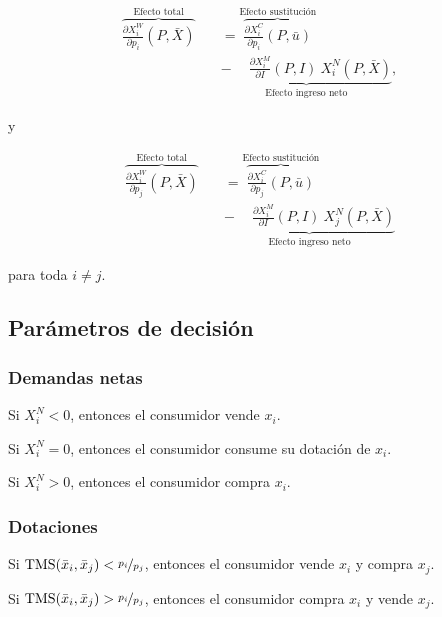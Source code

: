 \documentclass[8pt,a4paper]{extarticle}
\begin{document}
\begin{multicols}{3}
\begin{boxtheo}
	\begin{equation*}
	\begin{aligned}
		\overbrace{\frac{\partial X^W_i}{\partial p_i} (P, \bar{X})}^{\text{Efecto total}} \quad &= \overbrace{\frac{\partial X^C_i}{\partial p_i} (P, \bar{u})}^{\text{Efecto sustitución}} \\
																						   & \underbrace{ - \quad\ \frac{\partial X_i^M}{\partial I} (P, I)\ X^N_i (P,\bar{X})}_{\text{Efecto ingreso neto}},
	\end{aligned}
	\end{equation*}
	
	y
	
	\begin{equation*}
	\begin{aligned}
		\overbrace{\frac{\partial X^W_i}{\partial p_j} (P, \bar{X})}^{\text{Efecto total}} \quad &= \overbrace{\frac{\partial X^C_i}{\partial p_j} (P, \bar{u})}^{\text{Efecto sustitución}} \\
																						   & \underbrace{ - \quad\ \frac{\partial X_i^M}{\partial I} (P, I)\ X^N_j (P,\bar{X})}_{\text{Efecto ingreso neto}}
	\end{aligned}
	\end{equation*} 

	para toda $i \neq j$.
\end{boxtheo}

\subsection{Parámetros de decisión}

\subsubsection*{Demandas netas}

\begin{eqlist}
\item Si $X_i^N < 0$, entonces el consumidor vende $x_i$.
\item Si $X_i^N = 0$, entonces el consumidor consume su dotación de $x_i$.
\item Si $X_i^N > 0$, entonces el consumidor compra $x_i$.
\end{eqlist}

\subsubsection*{Dotaciones}

\begin{eqlist}
\item Si $\text{TMS} (\bar{x}_i, \bar{x}_j) < \nicefrac{p_i}{p_j}$, entonces el consumidor vende $x_i$ y compra $x_j$.
\item Si $\text{TMS} (\bar{x}_i, \bar{x}_j) > \nicefrac{p_i}{p_j}$, entonces el consumidor compra $x_i$ y vende $x_j$.
\end{eqlist}


\end{multicols}
\end{document}
